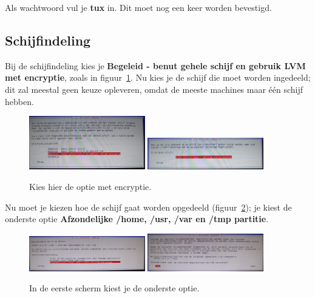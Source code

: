 \documentclass[12pt,a4paper]{article}
\begin{document}
Als wachtwoord vul je \textbf{tux} in. Dit moet nog een keer worden bevestigd.


\subsection{Schijfindeling}
Bij de schijfindeling kies je \textbf{Begeleid - benut gehele schijf en gebruik LVM met encryptie}, zoals in figuur~\ref{fig:schijven-indelen}.
Nu kies je de schijf die moet worden ingedeeld; dit zal meestal geen keuze opleveren, omdat de meeste machines maar \'{e}\'{e}n schijf hebben.

\begin{figure}[H]
\centering
\includegraphics[width=0.45\textwidth]{schijven-indelen-scherm}
\includegraphics[width=0.45\textwidth]{schijf-uitkiezen-scherm}
\caption{Kies hier de optie met encryptie.}
\label{fig:schijven-indelen}
\end{figure}


Nu moet je kiezen hoe de schijf gaat worden opgedeeld (figuur~\ref{fig:aparte-partities}); je kiest de onderste optie \textbf{Afzondelijke /home, /usr, /var en /tmp partitie}.

\begin{figure}[H]
\centering
\includegraphics[width=0.45\textwidth]{schijf-indelen-afzonderlijke-partities}
\includegraphics[width=0.45\textwidth]{lvm-instellen-scherm}
\caption{In de eerste scherm kiest je de onderste optie.}
\label{fig:aparte-partities}
\end{figure}
\end{document}
